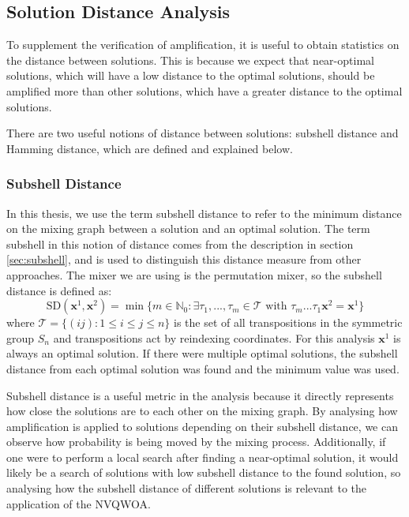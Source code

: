     \subsection{Solution Distance Analysis}\label{sec:solution distance}
To supplement the verification of amplification, it is useful to obtain statistics on the distance between solutions. This is because we expect that near-optimal solutions, which will have a low distance to the optimal solutions, should be amplified more than other solutions, which have a greater distance to the optimal solutions.

There are two useful notions of distance between solutions: subshell distance and Hamming distance, which are defined and explained below.

    \subsubsection{Subshell Distance}
In this thesis, we use the term subshell distance to refer to the minimum distance on the mixing graph between a solution and an optimal solution. The term subshell in this notion of distance comes from the description in section \ref{sec:subshell}, and is used to distinguish this distance measure from other approaches. The mixer we are using is the permutation mixer, so the subshell distance is defined as:
$$\text{SD}(\mathbf{x}^1,\mathbf{x}^2)=\min \{m\in \mathbb{N}_0: \exists \tau_1,...,\tau_m \in \mathcal{T} \text{ with } \tau_m ... \tau_1 \mathbf{x}^2 = \mathbf{x}^1\}$$
where $\mathcal{T}=\{(ij):1 \leq i \leq j \leq n \}$ is the set of all transpositions in the symmetric group $S_n$ and transpositions act by reindexing coordinates. For this analysis $\mathbf{x}^1$ is always an optimal solution. If there were multiple optimal solutions, the subshell distance from each optimal solution was found and the minimum value was used.

Subshell distance is a useful metric in the analysis because it directly represents how close the solutions are to each other on the mixing graph. By analysing how amplification is applied to solutions depending on their subshell distance, we can observe how probability is being moved by the mixing process. Additionally, if one were to perform a local search after finding a near-optimal solution, it would likely be a search of solutions with low subshell distance to the found solution, so analysing how the subshell distance of different solutions is relevant to the application of the NVQWOA.

